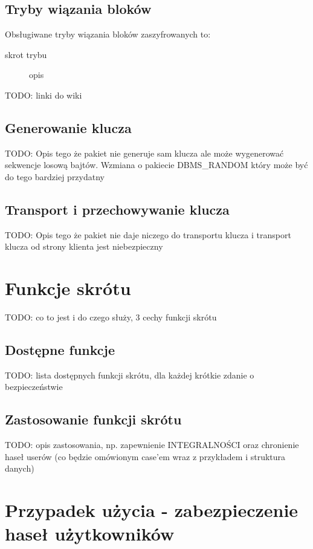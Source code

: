 \documentclass[12pt, a4paper]{article}
\begin{document}
\subsection{Tryby wiązania bloków}
Obsługiwane tryby wiązania bloków zaszyfrowanych to:
\begin{description}
\item[skrot trybu] opis 
\end{description}

TODO: linki do wiki

\subsection{Generowanie klucza}
TODO: Opis tego że pakiet nie generuje sam klucza ale może wygenerować sekwencje
 losową bajtów. Wzmiana o pakiecie DBMS\_RANDOM który może być do tego bardziej
 przydatny

\subsection{Transport i przechowywanie klucza}
TODO: Opis tego że pakiet nie daje niczego do transportu klucza i transport
klucza od strony klienta jest niebezpieczny

\section{Funkcje skrótu}
TODO: co to jest i do czego służy, 3 cechy funkcji skrótu

\subsection{Dostępne funkcje}
TODO: lista dostępnych funkcji skrótu, dla każdej krótkie zdanie o
bezpieczeństwie

\subsection{Zastosowanie funkcji skrótu}
TODO: opis zastosowania, np. zapewnienie INTEGRALNOŚCI oraz chronienie haseł
userów (co będzie omówionym case'em wraz z przykładem i struktura danych)



\section{Przypadek użycia - zabezpieczenie haseł użytkowników}
  
\end{document}
